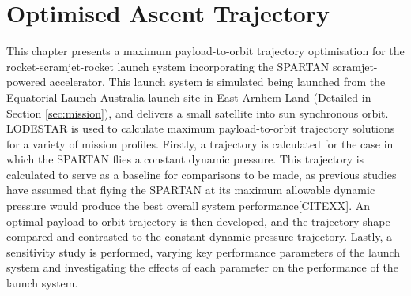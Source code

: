 
\cleardoublepage
\chapter{Optimised Ascent Trajectory}\label{chapter:Ascent}

This chapter presents a maximum payload-to-orbit trajectory optimisation for the rocket-scramjet-rocket launch system incorporating the SPARTAN scramjet-powered accelerator. 
This launch system is simulated being launched from the Equatorial Launch Australia launch site in East Arnhem Land (Detailed in Section \ref{sec:mission}), and delivers a small satellite into sun synchronous orbit. LODESTAR is used to calculate maximum payload-to-orbit trajectory solutions for a variety of mission profiles.
Firstly, a trajectory is calculated for the case in which the SPARTAN flies a constant dynamic pressure. This trajectory is calculated to serve as a baseline for comparisons to be made, as previous studies have assumed that flying the SPARTAN at its maximum allowable dynamic pressure would produce the best overall system performance[CITEXX]. An optimal payload-to-orbit trajectory is then developed, and the trajectory shape compared and contrasted to the constant dynamic pressure trajectory.
Lastly, a sensitivity study is performed, varying key performance parameters of the launch system and investigating the effects of each parameter on the performance of the launch system. 

